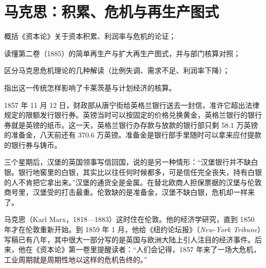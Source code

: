 \chapter{马克思：积累、危机与再生产图式}\label{ch:marx}

\begin{chapterguide}
\begin{guidegoals}
\item 概括《资本论》关于资本积累、利润率与危机的论证；
\item 读懂第二卷（1885）的简单再生产与扩大再生产图式，并与部门核算对照；
\item 区分马克思危机理论的几种解读（比例失调、需求不足、利润率下降）；
\item 指出这一传统怎样影响了卡莱茨基与计划经济的核算。
\end{guidegoals}
\end{chapterguide}

1857 年 11 月 12 日，财政部从唐宁街给英格兰银行送去一封信，准许它超出法律规定的限额发行银行券\cite{evans1859}。英镑当时可以按固定的价格兑换黄金，英格兰银行的银行券就是英镑的纸币。这一天，英格兰银行办存款与放款的银行部只剩 58.1 万英镑的准备金，八天前还有 370.6 万英镑\cite{evans1859}。准备金是银行部手里随时可以拿来应付提款的银行券与铸币。

三个星期后，汉堡的英国领事写信回国，说的是另一种情形：“汉堡银行并不缺白银。银行地窖里的白银，其实比以往任何时候都多，可是信任完全丧失，持有白银的人不肯把它拿出来。”\cite{evans1859}汉堡的通货全是金属\cite{evans1859}。在替北欧商人担保票据的汉堡与伦敦商号里，汉堡受的打击最重\cite{evans1859}。伦敦缺的是准备金，汉堡不缺白银，危机却一样来了。

马克思（Karl Marx，1818—1883）这时住在伦敦。他的经济学研究，直到 1850 年才在伦敦重新开始。到 1859 年 1 月，他给《纽约论坛报》（\emph{New-York Tribune}）写稿已有八年，其中很大一部分写的是英国与欧洲大陆上引人注目的经济事件\cite{marx1859}。后来，他在《资本论》第一卷里提醒读者：“人们会记得，1857 年来了一场大危机，工业周期就是周期性地以这样的危机告终的。”\cite{marx1887}

